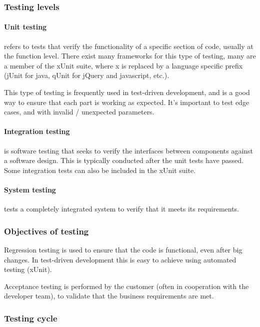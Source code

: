 \subsubsection{Testing levels}

\paragraph{Unit testing} refers to tests that verify the functionality of a specific section
of code, usually at the function level. There exist many frameworks for this
type of testing, many are a member of the xUnit suite, where x is replaced by a
language specific prefix (jUnit for java, qUnit for jQuery and javascript, etc.).

This type of testing is frequently used in test-driven development, and is a
good way to ensure that each part is working as expected. It's important to test
edge cases, and with invalid / unexpected parameters.

\paragraph{Integration testing} is software testing that seeks to verify the interfaces
between components against a software design. This is typically conducted after
the unit tests have passed. Some integration tests can also be included in the
xUnit suite.

\paragraph{System testing} tests a completely integrated system to verify that it meets its
requirements.

\subsubsection{Objectives of testing}

Regression testing is used to ensure that the code is functional, even after big
changes. In test-driven development this is easy to achieve using automated
testing (xUnit).

Acceptance testing is performed by the customer (often in cooperation with the
developer team), to validate that the business requirements are met.

\subsubsection{Testing cycle}

